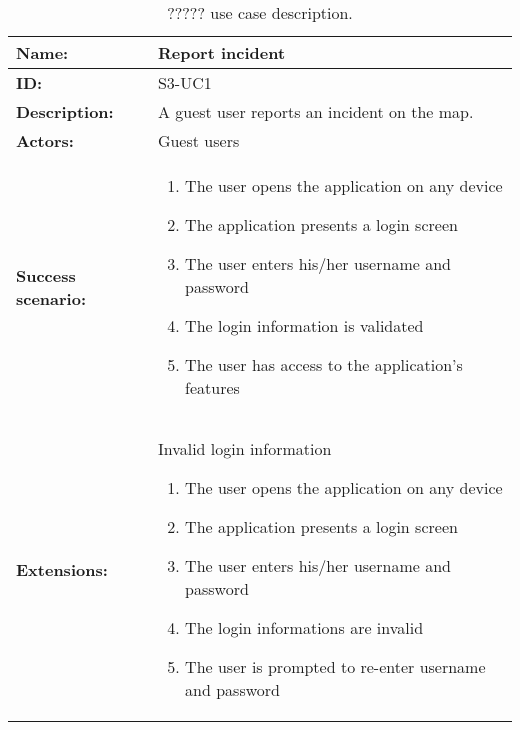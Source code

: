 \begin{table}[h!]
    \centering
    \begin{tabularx}{\textwidth}{|l|X|}
        \hline
        \textbf{Name:}  & Report incident \\ \hline
        \textbf{ID:}    & S3-UC1 \\ \hline
        \textbf{Description:} & A guest user reports an incident on the map. \\ \hline
        \textbf{Actors:} & Guest users \\ \hline
        \textbf{Success scenario:} & 
        \begin{enumerate}
            \item The user opens the application on any device
            \item The application presents a login screen
            \item The user enters his/her username and password
            \item The login information is validated
            \item The user has access to the application's features
        \end{enumerate}
        \\ \hline
        \textbf{Extensions:} & Invalid login information \newline
        \begin{enumerate}
            \item The user opens the application on any device
            \item The application presents a login screen
            \item The user enters his/her username and password
            \item The login informations are invalid
            \item The user is prompted to re-enter username and password
        \end{enumerate}
        \\ \hline
    \end{tabularx}
    \caption{????? use case description.}
    \label{tab:s3-uc1}
\end{table}